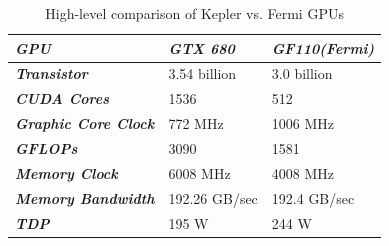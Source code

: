 \begin{table}
	\centering
    \caption{High-level comparison of Kepler vs. Fermi GPUs}
\label{tab:cudaGtxspec}
\begin{tabular}{ | l | l | l |}
    \hline
    \textbf{\textit{GPU}} 		& \textbf{\textit{GTX 680}} &
    \textbf{\textit{GF110(Fermi)}}
    \\ \hline \textbf{\textit{Transistor}}  & 3.54 billion & 3.0    billion\\
    \hline \textbf{\textit{CUDA Cores}}  & 1536		  & 512\\ \hline
    \textbf{\textit{Graphic Core Clock}}  & 772 MHz & 1006 MHz  \\ \hline
    \textbf{\textit{GFLOPs}}  & 3090 & 1581\\ \hline
    \textbf{\textit{Memory Clock}}  & 6008 MHz & 4008 MHz\\ \hline
    \textbf{\textit{Memory Bandwidth}}  & 192.26 GB/sec & 192.4 GB/sec\\ \hline
    \textbf{\textit{TDP}}  & 195 W & 244 W\\ \hline
\end{tabular}   
\end{table}
    

